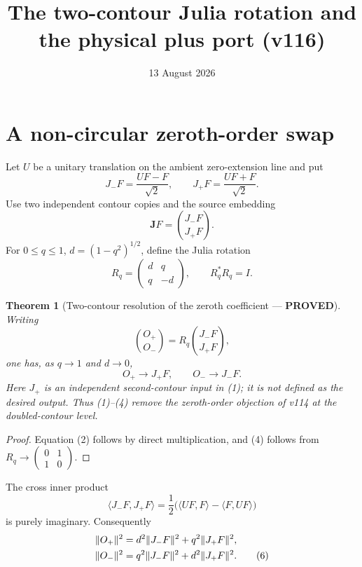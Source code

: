 \documentclass[11pt]{article}
\title{The two-contour Julia rotation and the physical plus port (v116)}
\date{13 August 2026}
\newcommand{\PROVED}{\textcolor{green!40!black}{\textbf{PROVED}}}
\newtheorem{theorem}{Theorem}
\begin{document}
\maketitle

\section{A non-circular zeroth-order swap}

Let $U$ be a unitary translation on the ambient zero-extension line and put
\[
 J_-F=\frac{UF-F}{\sqrt2},
 \qquad
 J_+F=\frac{UF+F}{\sqrt2}.
\]
Use two independent contour copies and the source embedding
\begin{equation}
                         \mathbf JF=\binom{J_-F}{J_+F}.         \tag{1}
\end{equation}
For $0\le q\le1$, $d=(1-q^2)^{1/2}$, define the Julia rotation
\begin{equation}
 R_q=\begin{pmatrix}d&q\\q&-d\end{pmatrix},
 \qquad R_q^*R_q=I.                                           \tag{2}
\end{equation}

\begin{theorem}[Two-contour resolution of the zeroth coefficient ---
\PROVED]
Writing
\begin{equation}
 \binom{O_+}{O_-}=R_q\binom{J_-F}{J_+F},                       \tag{3}
\end{equation}
one has, as $q\to1$ and $d\to0$,
\begin{equation}
                         O_+\longrightarrow J_+F,
 \qquad                  O_-\longrightarrow J_-F.             \tag{4}
\end{equation}
Here $J_+$ is an independent second-contour input in (1); it is not defined
as the desired output.  Thus (1)--(4) remove the zeroth-order objection of
v114 at the doubled-contour level.
\end{theorem}

\begin{proof}
Equation (2) follows by direct multiplication, and (4) follows from
$R_q\to\left(\begin{smallmatrix}0&1\\1&0\end{smallmatrix}\right)$.
\end{proof}

The cross inner product
\begin{equation}
 \langle J_-F,J_+F\rangle
 =\frac12\bigl(\langle UF,F\rangle-\langle F,UF\rangle\bigr)  \tag{5}
\end{equation}
is purely imaginary.  Consequently
\begin{align}
 \|O_+\|^2&=d^2\|J_-F\|^2+q^2\|J_+F\|^2,\notag\\
 \|O_-\|^2&=q^2\|J_-F\|^2+d^2\|J_+F\|^2.                    \tag{6}
\end{align}
\end{document}
